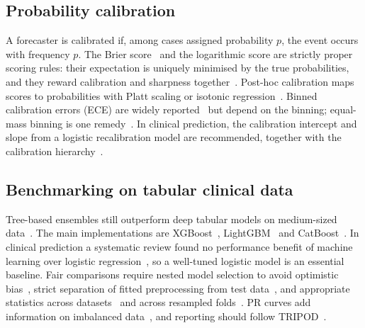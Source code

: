 \subsection{Probability calibration}
A forecaster is calibrated if, among cases assigned probability $p$, the event occurs
with frequency $p$. The Brier score~\cite{brier1950} and the logarithmic score are
strictly proper scoring rules: their expectation is uniquely minimised by the true
probabilities, and they reward calibration and sharpness
together~\cite{gneiting2007}. Post-hoc calibration maps scores to probabilities with
Platt scaling or isotonic regression~\cite{zadrozny2002,niculescu2005}. Binned
calibration errors (ECE) are widely reported~\cite{naeini2015,guo2017} but depend on
the binning; equal-mass binning is one remedy~\cite{nixon2019}. In clinical
prediction, the calibration intercept and slope from a logistic recalibration
model are recommended, together with the calibration
hierarchy~\cite{steyerberg2010,vancalster2016,vancalster2019,huang2020}.

\subsection{Benchmarking on tabular clinical data}
Tree-based ensembles still outperform deep tabular models on medium-sized
data~\cite{grinsztajn2022,shwartzziv2022}. The main implementations are
XGBoost~\cite{chen2016}, LightGBM~\cite{ke2017} and CatBoost~\cite{prokhorenkova2018}. In
clinical prediction a systematic review found no performance benefit of machine
learning over logistic regression~\cite{christodoulou2019}, so a well-tuned logistic
model is an essential baseline. Fair comparisons require nested model selection to
avoid optimistic bias~\cite{cawley2010}, strict separation of fitted preprocessing from
test data~\cite{kaufman2012}, and appropriate statistics across
datasets~\cite{demsar2006} and across resampled folds~\cite{nadeau2003}. PR curves add
information on imbalanced data~\cite{saito2015}, and reporting should follow
TRIPOD~\cite{collins2015}.
